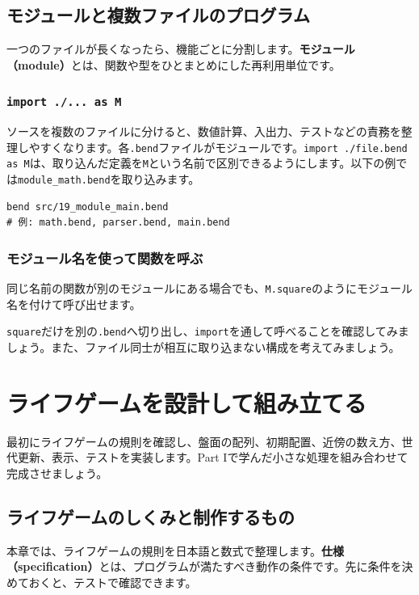 \documentclass[11pt,a4paper,openany]{book}
\newcommand{\code}[1]{\texttt{#1}}
\newcommand{\term}[1]{\textbf{#1}}
\newcommand{\readcode}[2]{}
\newcommand{\exercise}[1]{\begin{exercisebox}#1\end{exercisebox}}
\newcommand{\partchaptertoc}{%
  \begingroup
  \etocsetnexttocdepth{chapter}%
  \etocsettocstyle{%
    \vspace{2mm}\begin{tcolorbox}[colback=paper,colframe=blue!32,boxrule=.5pt,arc=2mm,
        title={\sffamily\bfseries このPartの目次},coltitle=ink,fonttitle=\sffamily\bfseries]
    \small\sffamily
  }{\end{tcolorbox}}%
  \localtableofcontents
  \endgroup
}
\begin{document}
\chapter{モジュールと複数ファイルのプログラム}
\begin{tcolorbox}[colback=blue!3,colframe=blue!16,boxrule=.35pt,arc=1mm,left=3mm,right=3mm,top=2mm,bottom=2mm]
\small 一つのファイルが長くなったら、機能ごとに分割します。\term{モジュール（module）}とは、関数や型をひとまとめにした再利用単位です。
\end{tcolorbox}

\section{\code{import ./... as M}}
ソースを複数のファイルに分けると、数値計算、入出力、テストなどの責務を整理しやすくなります。各\code{.bend}ファイルがモジュールです。\code{import ./file.bend as M}は、取り込んだ定義を\code{M}という名前で区別できるようにします。以下の例では\code{module\_math.bend}を取り込みます。
\readcode{module_math.bend}{取り込まれる側の定義（module\_math.bend）}
\readcode{19_module_main.bend}{別ファイルから定義を呼ぶ（19\_module\_main.bend）}
\begin{lstlisting}[language={},caption={モジュールの実行と将来の分割}]
bend src/19_module_main.bend
# 例: math.bend, parser.bend, main.bend
\end{lstlisting}
\section{モジュール名を使って関数を呼ぶ}
同じ名前の関数が別のモジュールにある場合でも、\code{M.square}のようにモジュール名を付けて呼び出せます。
\exercise{\code{square}だけを別の\code{.bend}へ切り出し、\code{import}を通して呼べることを確認してみましょう。また、ファイル同士が相互に取り込まない構成を考えてみましょう。}

\clearpage
\part{ライフゲームを設計して組み立てる}
\partchaptertoc
\begin{pointbox}
最初にライフゲームの規則を確認し、盤面の配列、初期配置、近傍の数え方、世代更新、表示、テストを実装します。Part Iで学んだ小さな処理を組み合わせて完成させましょう。
\end{pointbox}
\chapter{ライフゲームのしくみと制作するもの}\label{ch:life-spec}
\begin{tcolorbox}[colback=blue!3,colframe=blue!16,boxrule=.35pt,arc=1mm,left=3mm,right=3mm,top=2mm,bottom=2mm]
\small 本章では、ライフゲームの規則を日本語と数式で整理します。\term{仕様（specification）}とは、プログラムが満たすべき動作の条件です。先に条件を決めておくと、テストで確認できます。
\end{tcolorbox}
\end{document}
